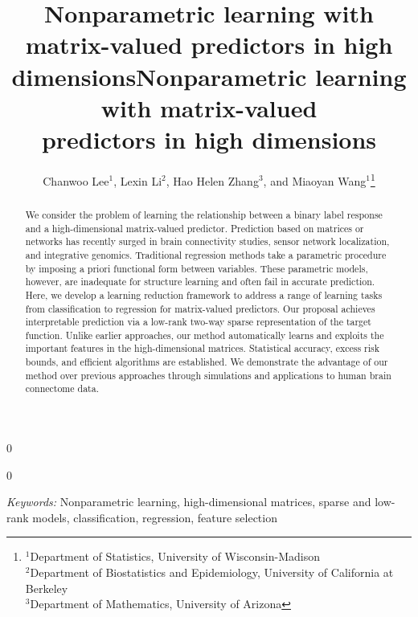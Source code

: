 \documentclass[11pt]{article}
\newcommand{\blind}{0}
\theoremstyle{plain}
\theoremstyle{definition}
\begin{document}
\blind
{   \date{}
  \title{\bf Nonparametric learning with matrix-valued predictors in high dimensions}
\author{ Chanwoo Lee$^{1}$, Lexin Li$^2$, Hao Helen Zhang$^3$, and Miaoyan Wang$^1$\footnote{
\hspace*{-.6cm}$^1$Department of Statistics, University of Wisconsin-Madison\\
$^2$Department of Biostatistics and Epidemiology, University of California at Berkeley\\
$^3$Department of Mathematics, University of Arizona}
}

    \maketitle
} \fi

\blind
{
 \date{}
  \title{\bf Nonparametric learning with matrix-valued \\predictors in high dimensions}
\author{}
\maketitle
} \fi

\begin{abstract}
We consider the problem of learning the relationship between a binary label response and a high-dimensional matrix-valued predictor. Prediction based on matrices or networks has recently surged in brain connectivity studies, sensor network localization, and integrative genomics. Traditional regression methods take a parametric procedure by imposing a priori functional form between variables. These parametric models, however, are inadequate for structure learning and often fail in accurate prediction. Here, we develop a learning reduction framework to address a range of learning tasks from classification to regression for matrix-valued predictors. Our proposal achieves interpretable prediction via a low-rank two-way sparse representation of the target function. Unlike earlier approaches, our method automatically learns and exploits the important features in the high-dimensional matrices. Statistical accuracy, excess risk bounds, and efficient algorithms are established. We demonstrate the advantage of our method over previous approaches through simulations and applications to human brain connectome data. 

\end{abstract}
\noindent%
{\it Keywords:}  Nonparametric learning, high-dimensional matrices, sparse and low-rank models, classification, regression, feature selection
\end{document}
